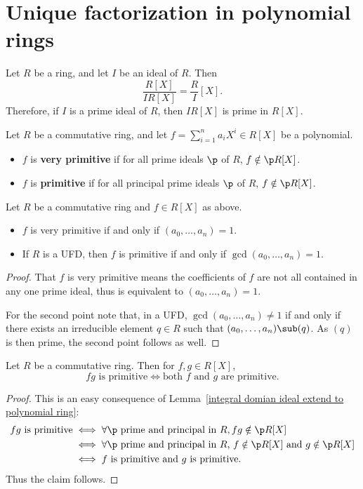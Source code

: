 \section{Unique factorization in polynomial rings}
\begin{lemma}\label{integral domian ideal extend to polynomial ring}
Let $R$ be a ring, and let $I$ be an ideal of $R$. Then
\[\frac{R[X]}{IR[X]}=\frac{R}{I}[X].\]
Therefore, if $I$ is a prime ideal of $R$, then $IR[X]$ is prime in $R[X]$.
\end{lemma}
\begin{definition}
Let $R$ be a commutative ring, and let $f=\sum_{i=1}^{n}a_iX^i\in R[X]$ be a polynomial.
\begin{itemize}
\item $f$ is \textbf{very primitive} if for all prime ideals $\p$ of $R$, $f\notin\p R[X]$.
\item $f$ is \textbf{primitive} if for all principal prime ideals $\p$ of $R$, $f\notin\p R[X]$.
\end{itemize}
\end{definition}
\begin{lemma}
Let $R$ be a commutative ring and $f\in R[X]$ as above.
\begin{itemize}
\item $f$ is very primitive if and only if $(a_0,\dots,a_n)=1$.
\item If $R$ is a UFD, then $f$ is primitive if and only if $\gcd(a_0,\dots,a_n)=1$.
\end{itemize}
\end{lemma}
\begin{proof}
That $f$ is very primitive means the coefficients of $f$ are not all contained in any one prime ideal, thus is equivalent to $(a_0,\dots,a_n)=1$.\par
For the second point note that, in a UFD, $\gcd(a_0,\dots,a_n)\neq1$ if and only if there exists an irreducible element $q\in R$ such that $(a_0,\dots,a_n)\sub(q)$. As $(q)$ is then prime, the second point follows as well.
\end{proof}
\begin{lemma}\label{polynomial product is primitive iff}
Let $R$ be a commutative ring. Then for $f,g\in R[X]$,
\[\text{$fg$ is primitive}\iff\text{both $f$ and $g$ are primitive}.\]
\end{lemma}
\begin{proof}
This is an easy consequence of Lemma~\ref{integral domian ideal extend to polynomial ring}:
\begin{align*}
\text{$fg$ is primitive}&\iff\text{$\forall\p$ prime and principal in $R,fg\notin\p R[X]$}\\
&\iff\text{$\forall\p$ prime and principal in $R$, $f\notin\p R[X]$ and $g\notin\p R[X]$}\\
&\iff\text{$f$ is primitive and $g$ is primitive}.
\end{align*}
Thus the claim follows.
\end{proof}
